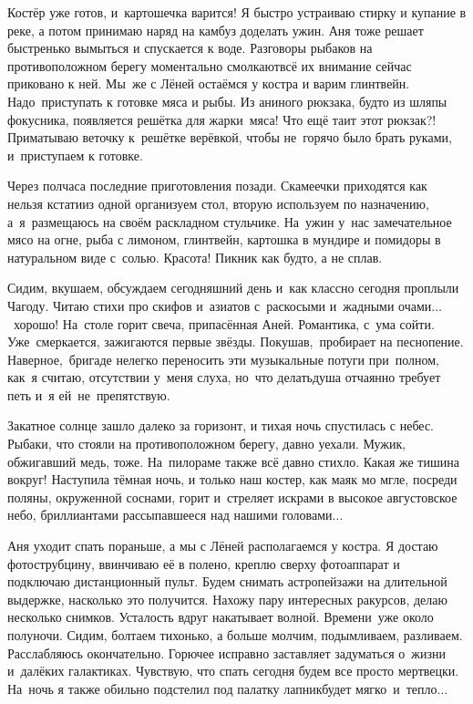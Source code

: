 \newpage
Костёр уже готов, и~картошечка варится! Я быстро устраиваю стирку и купание в реке, а потом принимаю наряд на камбуз доделать ужин. Аня тоже решает быстренько вымыться и спускается к воде. Разговоры рыбаков на противоположном берегу моментально смолкают\mdash всё их внимание сейчас приковано к ней. Мы~же с Лёней остаёмся у костра и варим глинтвейн. Надо~приступать к готовке мяса и рыбы. Из аниного рюкзака, будто из шляпы фокусника, появляется решётка для жарки~мяса! Что ещё таит этот рюкзак?! Приматываю веточку к~решётке верёвкой, чтобы не~горячо было брать руками, и~приступаем к готовке. 

Через полчаса последние приготовления позади. Скамеечки приходятся как нельзя кстати\mdash из одной организуем стол, вторую используем по назначению, а~я~размещаюсь на своём раскладном стульчике. На~ужин у~нас замечательное мясо на огне, рыба с лимоном, глинтвейн, картошка в мундире и помидоры в натуральном виде с~солью. Красота! Пикник как будто, а не сплав. 

Сидим, вкушаем, обсуждаем сегодняшний день и~как классно сегодня проплыли Чагоду. Читаю стихи про скифов и~азиатов с~раскосыми и~жадными очами$\ldots$~хорошо! На~столе горит свеча, припасённая Аней. Романтика, с~ума сойти. Уже~смеркается, зажигаются первые звёзды. Покушав,~пробирает на песнопение. Наверное,~бригаде нелегко переносить эти музыкальные потуги при~полном, как~я считаю, отсутствии у~меня слуха, но~что делать\mdash душа отчаянно требует петь и~я ей~не~препятствую. 

Закатное солнце зашло далеко за горизонт, и тихая ночь спустилась с небес. Рыбаки, что стояли на противоположном берегу, давно уехали. Мужик, обжигавший медь, тоже. На~пилораме также всё давно стихло. Какая же тишина вокруг! Наступила тёмная ночь, и только наш костер, как маяк мо мгле, посреди поляны, окруженной соснами, горит и~стреляет искрами в высокое августовское небо, бриллиантами рассыпавшееся над нашими головами$\ldots$

Аня уходит спать пораньше, а мы с Лёней располагаемся у костра. Я достаю фотострубцину, ввинчиваю её в полено, креплю сверху фотоаппарат и подключаю дистанционный пульт. Будем снимать астропейзажи на длительной выдержке, насколько это получится. Нахожу пару интересных ракурсов, делаю несколько снимков. Усталость вдруг накатывает волной. Времени~уже около полуночи. Сидим, болтаем тихонько, а больше молчим, подымливаем, разливаем. Расслабляюсь окончательно. Горючее исправно заставляет задуматься о~жизни и~далёких галактиках. Чувствую, что спать сегодня будем все просто мертвецки. На~ночь я также обильно подстелил под палатку лапник\mdash будет мягко~и~тепло$\ldots$
  
